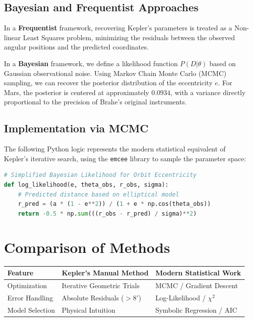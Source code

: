 \documentclass[11pt]{article}
\begin{document}
\subsection{Bayesian and Frequentist Approaches}
In a \textbf{Frequentist} framework, recovering Kepler's parameters is treated as a Non-linear Least Squares problem, minimizing the residuals between the observed angular positions and the predicted coordinates.

In a \textbf{Bayesian} framework, we define a likelihood function $P(D | \theta)$ based on Gaussian observational noise. Using Markov Chain Monte Carlo (MCMC) sampling, we can recover the posterior distribution of the eccentricity $e$. For Mars, the posterior is centered at approximately $0.0934$, with a variance directly proportional to the precision of Brahe's original instruments.

\subsection{Implementation via MCMC}
The following Python logic represents the modern statistical equivalent of Kepler’s iterative search, using the \texttt{emcee} library to sample the parameter space:

\begin{lstlisting}[language=Python, basicstyle=\small\ttfamily, breaklines=true, keywordstyle=\color{blue}]
# Simplified Bayesian Likelihood for Orbit Eccentricity
def log_likelihood(e, theta_obs, r_obs, sigma):
    # Predicted distance based on elliptical model
    r_pred = (a * (1 - e**2)) / (1 + e * np.cos(theta_obs))
    return -0.5 * np.sum(((r_obs - r_pred) / sigma)**2)
\end{lstlisting}

\section{Comparison of Methods}
\begin{center}
\begin{tabular}{@{}lll@{}}
\toprule
\textbf{Feature} & \textbf{Kepler's Manual Method} & \textbf{Modern Statistical Work} \\ \midrule
Optimization & Iterative Geometric Trials & MCMC / Gradient Descent \\
Error Handling & Absolute Residuals ($>8'$) & Log-Likelihood / $\chi^2$ \\
Model Selection & Physical Intuition & Symbolic Regression / AIC \\ \bottomrule
\end{tabular}
\end{center}
\end{document}
